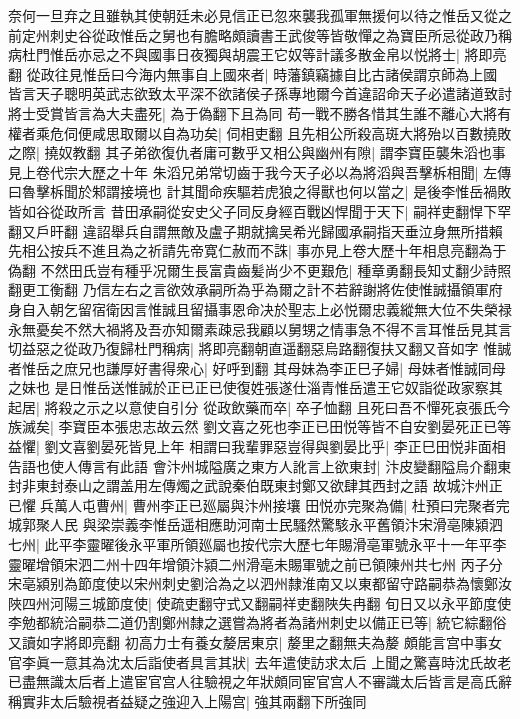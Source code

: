 奈何一旦弃之且雖執其使朝廷未必見信正已忽來襲我孤軍無援何以待之惟岳又從之前定州刺史谷從政惟岳之舅也有膽略頗讀書王武俊等皆敬憚之為寶臣所忌從政乃稱病杜門惟岳亦忌之不與國事日夜獨與胡震王它奴等計議多散金帛以悦將士|{
	將即亮翻}
從政往見惟岳曰今海内無事自上國來者|{
	時藩鎮竊據自比古諸侯謂京師為上國}
皆言天子聰明英武志欲致太平深不欲諸侯子孫專地爾今首違詔命天子必遣諸道致討將士受賞皆言為大夫盡死|{
	為于偽翻下且為同}
苟一戰不勝各惜其生誰不離心大將有權者乘危伺便咸思取爾以自為功矣|{
	伺相吏翻}
且先相公所殺高斑大將殆以百數撓敗之際|{
	撓奴教翻}
其子弟欲復仇者庸可數乎又相公與幽州有隙|{
	謂李寶臣襲朱滔也事見上卷代宗大歷之十年}
朱滔兄弟常切齒于我今天子必以為將滔與吾擊柝相聞|{
	左傳曰魯擊柝聞於邾謂接境也}
計其聞命疾驅若虎狼之得獸也何以當之|{
	是後李惟岳禍敗皆如谷從政所言}
昔田承嗣從安史父子同反身經百戰凶悍聞于天下|{
	嗣祥吏翻悍下罕翻又戶旰翻}
違詔舉兵自謂無敵及盧子期就擒吴希光歸國承嗣指天垂泣身無所措賴先相公按兵不進且為之祈請先帝寛仁赦而不誅|{
	事亦見上卷大歷十年相息亮翻為于偽翻}
不然田氏豈有種乎况爾生長富貴齒髪尚少不更艱危|{
	種章勇翻長知丈翻少詩照翻更工衡翻}
乃信左右之言欲效承嗣所為乎為爾之計不若辭謝將佐使惟誠攝領軍府身自入朝乞留宿衛因言惟誠且留攝事恩命决於聖志上必悦爾忠義縱無大位不失榮禄永無憂矣不然大禍將及吾亦知爾素疎忌我顧以舅甥之情事急不得不言耳惟岳見其言切益惡之從政乃復歸杜門稱病|{
	將即亮翻朝直遥翻惡烏路翻復扶又翻又音如字}
惟誠者惟岳之庶兄也謙厚好書得衆心|{
	好呼到翻}
其母妹為李正巳子婦|{
	母妹者惟誠同母之妹也}
是日惟岳送惟誠於正已正已使復姓張遂仕淄青惟岳遣王它奴詣從政家察其起居|{
	將殺之示之以意使自引分}
從政飲藥而卒|{
	卒子恤翻}
且死曰吾不憚死哀張氏今族滅矣|{
	李寶臣本張忠志故云然}
劉文喜之死也李正已田悦等皆不自安劉晏死正已等益懼|{
	劉文喜劉晏死皆見上年}
相謂曰我輩罪惡豈得與劉晏比乎|{
	李正巳田悦非面相告語也使人傳言有此語}
會汴州城隘廣之東方人訛言上欲東封|{
	汴皮變翻隘烏介翻東封非東封泰山之謂盖用左傳燭之武說秦伯既東封鄭又欲肆其西封之語}
故城汴州正已懼兵萬人屯曹州|{
	曹州李正已廵屬與汴州接壤}
田悦亦完聚為備|{
	杜預曰完聚者完城郭聚人民}
與梁崇義李惟岳遥相應助河南士民騷然驚駭永平舊領汴宋滑亳陳潁泗七州|{
	此平李靈曜後永平軍所領廵屬也按代宗大歷七年賜滑亳軍號永平十一年平李靈曜增領宋泗二州十四年增領汴潁二州滑亳未賜軍號之前已領陳州共七州}
丙子分宋亳潁别為節度使以宋州刺史劉洽為之以泗州隸淮南又以東都留守路嗣恭為懷鄭汝陜四州河陽三城節度使|{
	使疏吏翻守式又翻嗣祥吏翻陜失冉翻}
旬日又以永平節度使李勉都統洽嗣恭二道仍割鄭州隸之選嘗為將者為諸州刺史以備正已等|{
	統它綜翻俗又讀如字將即亮翻}
初高力士有養女嫠居東京|{
	嫠里之翻無夫為嫠}
頗能言宫中事女官李眞一意其為沈太后詣使者具言其狀|{
	去年遣使訪求太后}
上聞之驚喜時沈氏故老已盡無識太后者上遣宦官宫人往驗視之年狀頗同宦官宫人不審識太后皆言是高氏辭稱實非太后驗視者益疑之強迎入上陽宫|{
	強其兩翻下所強同}

